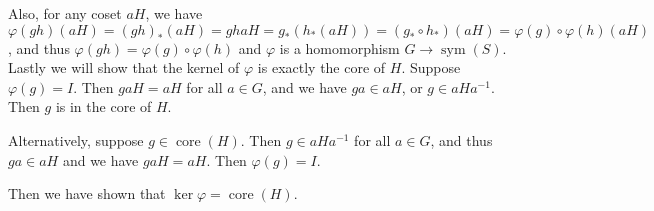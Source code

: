 \documentclass[11pt, reqno]{article}
\theoremstyle{plain}
\theoremstyle{definition}
\theoremstyle{remark}
\renewcommand{\phi}{\varphi}
\begin{document}
\begin{enumerate}
\begin{enumerate}
        Also, for any coset $aH$, we have $\phi(gh)(aH) = (gh)_*(aH) = ghaH = g_*(h_*(aH))
        = (g_*\circ h_*)(aH) = \phi(g)\circ \phi(h)(aH)$, and thus $\phi(gh) = \phi(g)\circ\phi(h)$
        and $\phi$ is a homomorphism $G \rightarrow \operatorname{sym}(S)$.
        \bigbreak
        Lastly we will show that the kernel of $\phi$ is exactly the core of $H$. Suppose 
        $\phi(g) = I$. Then $gaH = aH$ for all $a \in G$, and we have $ga \in aH$, or 
        $g \in aHa^{-1}$. Then $g$ is in the core of $H$. 

        Alternatively, suppose $g \in \operatorname{core}(H)$. Then $g \in aHa^{-1}$ for all $a \in G$,
        and thus $ga \in aH$ and we have $gaH = aH$. Then $\phi(g) = I$. 

        Then we have shown that $\ker \phi = \operatorname{core}(H)$.
    \end{enumerate}
\end{enumerate}
\end{document}
